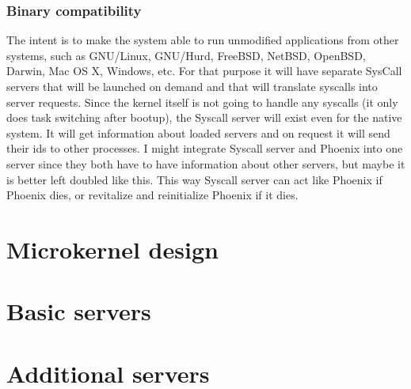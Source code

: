 \documentclass{article}
\begin{document}
\subsubsection{Binary compatibility}

The intent is to make the system able to run unmodified applications from other
systems, such as GNU/Linux, GNU/Hurd, FreeBSD, NetBSD, OpenBSD, Darwin, Mac OS X,
Windows, etc. For that purpose it will have separate SysCall servers that will be
launched on demand and that will translate syscalls into server requests. Since the
kernel itself is not going to handle any syscalls (it only does task switching after
bootup), the Syscall server will exist even for the native system. It will get
information about loaded servers and on request it will send their ids to other
processes. I might integrate Syscall server and Phoenix into one server since they
both have to have information about other servers, but maybe it is better left doubled
like this. This way Syscall server can act like Phoenix if Phoenix dies, or revitalize
and reinitialize Phoenix if it dies.

\section{Microkernel design}

\section{Basic servers}

\section{Additional servers}
\end{document}
